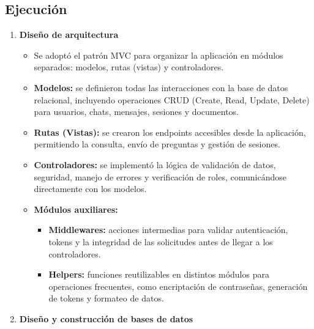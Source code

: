 \subsection{Ejecución}
\begin{enumerate}
      \item \textbf{Diseño de arquitectura}
            \begin{itemize}
                  \item Se adoptó el patrón MVC para organizar la aplicación en módulos separados:
                        modelos, rutas (vistas) y controladores.
                  \item \textbf{Modelos:} se definieron todas las interacciones con la base de datos relacional, incluyendo operaciones CRUD (Create, Read, Update, Delete) para usuarios, chats, mensajes, sesiones y documentos.
                  \item \textbf{Rutas (Vistas):} se crearon los endpoints accesibles desde la aplicación, permitiendo la consulta, envío de preguntas y gestión de sesiones.
                  \item \textbf{Controladores:} se implementó la lógica de validación de datos, seguridad, manejo de errores y verificación de roles, comunicándose directamente con los modelos.
                  \item \textbf{Módulos auxiliares:}
                        \begin{itemize}
                              \item \textbf{Middlewares:} acciones intermedias para validar autenticación, tokens y la integridad de las solicitudes antes de llegar a los controladores.
                              \item \textbf{Helpers:} funciones reutilizables en distintos módulos para operaciones frecuentes, como encriptación de contraseñas, generación de tokens y formateo de datos.
                        \end{itemize}
            \end{itemize}

      \item \textbf{Diseño y construcción de bases de datos}

\end{enumerate}
